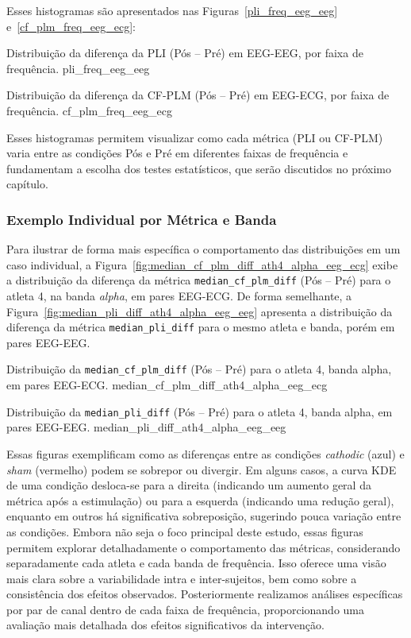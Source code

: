 Esses histogramas são apresentados nas Figuras~\ref{pli_freq_eeg_eeg} e~\ref{cf_plm_freq_eeg_ecg}:

{Distribuição da diferença da PLI (Pós -- Pré) em EEG-EEG, por faixa de frequência.}
{pli_freq_eeg_eeg}

{Distribuição da diferença da CF-PLM (Pós -- Pré) em EEG-ECG, por faixa de frequência.}
{cf_plm_freq_eeg_ecg}

Esses histogramas permitem visualizar como cada métrica (PLI ou CF-PLM) varia entre as condições Pós e Pré em diferentes faixas de frequência e fundamentam a escolha dos testes estatísticos, que serão discutidos no próximo capítulo.

\subsubsection{Exemplo Individual por Métrica e Banda}
Para ilustrar de forma mais específica o comportamento das distribuições em um caso individual, a Figura~\ref{fig:median_cf_plm_diff_ath4_alpha_eeg_ecg} exibe a distribuição da diferença da métrica \texttt{median\_cf\_plm\_diff} (Pós -- Pré) para o atleta 4, na banda \emph{alpha}, em pares EEG-ECG. De forma semelhante, a Figura~\ref{fig:median_pli_diff_ath4_alpha_eeg_eeg} apresenta a distribuição da diferença da métrica \texttt{median\_pli\_diff} para o mesmo atleta e banda, porém em pares EEG-EEG.

{Distribuição da \texttt{median\_cf\_plm\_diff} (Pós -- Pré) para o atleta 4, banda alpha, em pares EEG-ECG.}
{median_cf_plm_diff_ath4_alpha_eeg_ecg}

{Distribuição da \texttt{median\_pli\_diff} (Pós -- Pré) para o atleta 4, banda alpha, em pares EEG-EEG.}
{median_pli_diff_ath4_alpha_eeg_eeg}

Essas figuras exemplificam como as diferenças entre as condições \emph{cathodic} (azul) e \emph{sham} (vermelho) podem se sobrepor ou divergir. Em alguns casos, a curva KDE de uma condição desloca-se para a direita (indicando um aumento geral da métrica após a estimulação) ou para a esquerda (indicando uma redução geral), enquanto em outros há significativa sobreposição, sugerindo pouca variação entre as condições. Embora não seja o foco principal deste estudo, essas figuras permitem explorar detalhadamente o comportamento das métricas, considerando separadamente cada atleta e cada banda de frequência. Isso oferece uma visão mais clara sobre a variabilidade intra e inter-sujeitos, bem como sobre a consistência dos efeitos observados. Posteriormente realizamos análises específicas por par de canal dentro de cada faixa de frequência, proporcionando uma avaliação mais detalhada dos efeitos significativos da intervenção.

